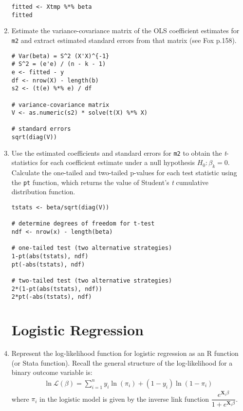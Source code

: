 \documentclass[a4paper,12pt]{article}
\newcommand{\matr}[1]{\mathbf{#1}}
\newcommand{\lik}{\mathcal{L}}
\begin{document}
\begin{enumerate}
\begin{solution}
\begin{lstlisting}
fitted <- Xtmp %*% beta
fitted
\end{lstlisting}
\end{solution}

\item Estimate the variance-covariance matrix of the OLS coefficient estimates for \texttt{m2} and extract estimated standard errors from that matrix (see Fox p.158).

\begin{solution}
\begin{lstlisting}
# Var(beta) = S^2 (X'X)^{-1}
# S^2 = (e'e) / (n - k - 1)
e <- fitted - y
df <- nrow(X) - length(b)
s2 <- (t(e) %*% e) / df

# variance-covariance matrix
V <- as.numeric(s2) * solve(t(X) %*% X)

# standard errors
sqrt(diag(V))
\end{lstlisting}
\end{solution}

\item Use the estimated coefficients and standard errors for \texttt{m2} to obtain the \textit{t}-statistics for each coefficient estimate under a null hypothesis $H_0: \beta_k = 0$. Calculate the one-tailed and two-tailed p-values for each test statistic using the \texttt{pt} function, which returns the value of Student's \textit{t} cumulative distribution function.

\begin{solution}
\begin{lstlisting}
tstats <- beta/sqrt(diag(V))

# determine degrees of freedom for t-test
ndf <- nrow(x) - length(beta)

# one-tailed test (two alternative strategies)
1-pt(abs(tstats), ndf)
pt(-abs(tstats), ndf)

# two-tailed test (two alternative strategies)
2*(1-pt(abs(tstats), ndf))
2*pt(-abs(tstats), ndf)
\end{lstlisting}
\end{solution}


\clearpage
\section*{Logistic Regression}

\item Represent the log-likelihood function for logistic regression as an R function (or Stata function). Recall the general structure of the log-likelihood for a binary outcome variable is: 
\begin{align*}
\ln\lik(\beta) = \sum_{i=1}^{n} y_i \ln(\pi_i) + (1-y_i) \ln(1-\pi_i)
\end{align*}
where $\pi_i$ in the logistic model is given by the inverse link function $\dfrac{e^{\matr{X}_i\beta}}{1 + e^{\matr{X}_i\beta}}$.


\end{enumerate}
\end{document}
